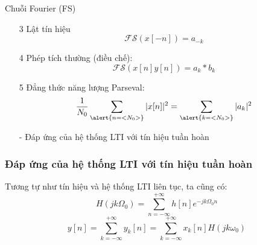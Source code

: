 \documentclass[8pt]{beamer}
\begin{document}
\begin{frame}{Chuỗi Fourier (FS)}
\begin{enumerate}
	\item[3] Lật tín hiệu $$\mathscr{FS}(x[-n])=a_{-k}$$
	\item[4] Phép tích thường (điều chế): $$\mathscr{FS}(x[n]y[n])=a_{k}*b_{k}$$
	\item[5] Đẳng thức năng lượng Parseval: $$\frac{1}{N_{0}}\sum_{\alert{n=<N_{0}>}}|x[n]|^2=\sum_{\alert{k=<N_{0}>}}|a_{k}|^2$$
\end{enumerate}
\begin{itemize}
	\item[-] Đáp ứng của hệ thống LTI với tín hiệu tuần hoàn
\end{itemize}
\subsubsection{Đáp ứng của hệ thống LTI với tín hiệu tuần hoàn}
 Tương tự như tín hiệu và hệ thống LTI liên tục, ta cũng có:
$$H(jk\Omega_{0})=\sum_{n=-\infty}^{+\infty}h[n]e^{-jk\Omega_{0}n}$$
$$y[n]=\sum_{k=-\infty}^{+\infty}y_{k}[n]=\sum_{k=-\infty}^{+\infty}x_{k}[n]H(jk\omega_{0})$$
\end{frame}
\end{document}
